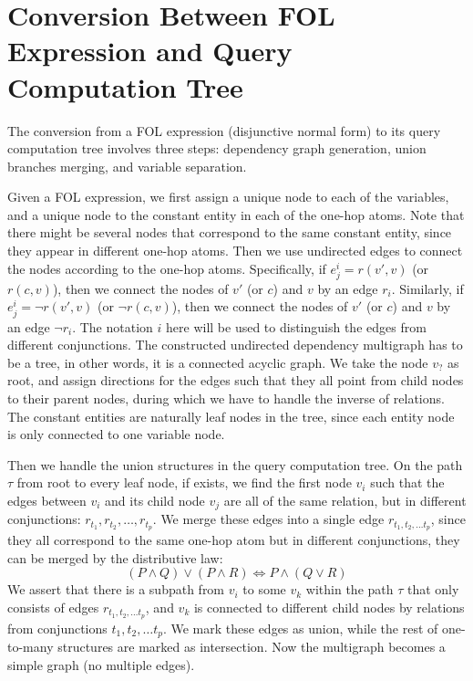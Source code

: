 \appendix
\onecolumn

\section{Conversion Between FOL Expression and Query Computation Tree}
\label{app:conversion}
The conversion from a FOL expression (disjunctive normal form) to its query computation tree involves three steps: dependency graph generation, union branches merging, and variable separation.

Given a FOL expression, we first assign a unique node to each of the variables, and a unique node to the constant entity in each of the one-hop atoms. Note that there might be several nodes that correspond to the same constant entity, since they appear in different one-hop atoms.
Then we use undirected edges to connect the nodes according to the one-hop atoms.
Specifically, if $e^i_j=r(v', v)$ (or $r(c, v)$), then we connect the nodes of $v'$ (or $c$) and $v$ by an edge $r_i$.
Similarly, if $e^i_j=\lnot r(v', v)$ (or $\lnot r(c, v)$), then we connect the nodes of $v'$ (or $c$) and $v$ by an edge $\lnot r_i$.
The notation $i$ here will be used to distinguish the edges from different conjunctions.
The constructed undirected dependency multigraph has to be a tree, in other words, it is a connected acyclic graph.
We take the node $v_?$ as root, and assign directions for the edges such that they all point from child nodes to their parent nodes, during which we have to handle the inverse of relations.
The constant entities are naturally leaf nodes in the tree, since each entity node is only connected to one variable node.

Then we handle the union structures in the query computation tree.
On the path $\tau$ from root to every leaf node, if exists, we find the first node $v_i$ such that the edges between $v_i$ and its child node $v_j$ are all of the same relation, but in different conjunctions: $r_{t_1}, r_{t_2}, \dots, r_{t_p}$.
We merge these edges into a single edge $r_{t_1, t_2, \dots t_p}$, since they all correspond to the same one-hop atom but in different conjunctions, they can be merged by the distributive law:
\begin{equation}
    (P\land Q)\lor(P\land R) \Leftrightarrow P\land(Q\lor R)
\end{equation}
We assert that there is a subpath from $v_i$ to some $v_k$ within the path $\tau$ that only consists of edges $r_{t_1, t_2, \dots t_p}$, and $v_k$ is connected to different child nodes by relations from conjunctions $t_1, t_2, \dots t_p$.
We mark these edges as union, while the rest of one-to-many structures are marked as intersection.
Now the multigraph becomes a simple graph (no multiple edges).

